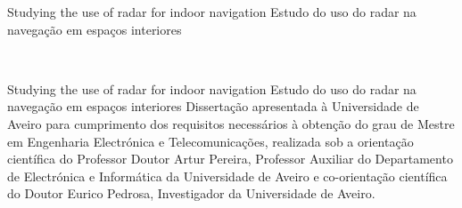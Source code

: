 %
%

\TitlePage
         {\ThesisYear}
        {Studying the use of radar for indoor navigation \newline Estudo do uso
do radar na navegação em espaços interiores}
        
\EndTitlePage
\titlepage\ \endtitlepage %


%
%

\TitlePage
  \HEADER{}{\ThesisYear}
        {Studying the use of radar for indoor navigation \newline Estudo do uso
do radar na navegação em espaços interiores}
  \vspace*{15mm}
  \TEXT{}
       {Dissertação apresentada à Universidade de Aveiro para cumprimento dos
re\-qui\-si\-tos necessários à obtenção do grau de Mestre em Engenharia Electrónica e Telecomunicações, realizada sob a orientação científica do Professor Doutor Artur Pereira, Professor Auxiliar do Departamento de
Electrónica e Informática da Universidade de Aveiro e co-orientação científica do Doutor Eurico Pedrosa, Investigador da
Universidade de Aveiro.
        }
        \vspace*{85mm}
\EndTitlePage
\titlepage\ \endtitlepage %

